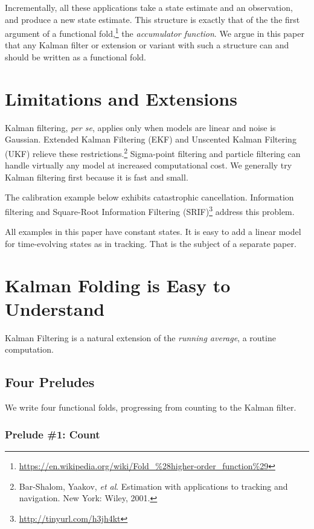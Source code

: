 \documentclass[10pt,oneside,x11names]{article}
\begin{document}
Incrementally, all these applications take a state estimate and an
observation, and produce a new state estimate. This structure is exactly that of
the the first argument of a functional fold,\footnote{\url{https://en.wikipedia.org/wiki/Fold_\%28higher-order_function\%29}} the \emph{accumulator
function}. We argue in this paper that any Kalman filter or extension or variant
with such a structure can and should be written as a functional fold.

\section{Limitations and Extensions}
\label{sec:orgheadline3}

Kalman filtering, \emph{per se}, applies only when models are linear and noise is
Gaussian. Extended Kalman Filtering (EKF) and Unscented Kalman Filtering (UKF)
relieve these restrictions.\footnote{Bar-Shalom, Yaakov, \emph{et al}. Estimation with applications to tracking and navigation. New York: Wiley, 2001.} Sigma-point filtering and particle
filtering can handle virtually any model at increased computational cost. We
generally try Kalman filtering first because it is fast and small.

The calibration example below exhibits catastrophic cancellation. Information
filtering and Square-Root Information Filtering (SRIF)\footnote{\url{http://tinyurl.com/h3jh4kt}} address this
problem.

All examples in this paper have constant states. It is easy to add a linear
model for time-evolving states as in tracking. That is the subject of a
separate paper.

\section{Kalman Folding is Easy to Understand}
\label{sec:orgheadline20}

Kalman Filtering is a natural extension of the \emph{running average}, a routine
computation. 

\subsection{Four Preludes}
\label{sec:orgheadline17}

We write four functional folds, progressing from counting to the Kalman
filter.

\subsubsection{Prelude \#1: Count}
\label{sec:orgheadline4}
\end{document}
